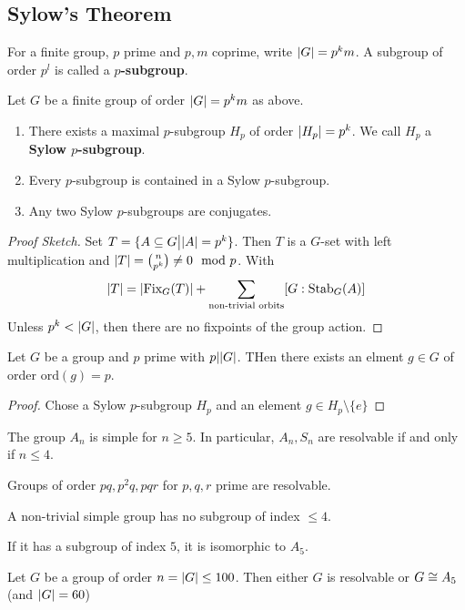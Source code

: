 \subsection{Sylow's Theorem}

\begin{dfn}[]
  For a finite group, $p$ prime and $p,m$ coprime, write
  $\vert G\vert = p^{k} m$.
  A subgroup of order $p^{l}$ is called a \textbf{$p$-subgroup}.
\end{dfn}

\begin{thm}
  Let $G$ be a finite group of order $\vert G\vert = p^{k}m$ as above. 
  \begin{enumerate}
    \item There exists a maximal $p$-subgroup $H_p$ of order $\vert H_p\vert = p^{k}$. We call $H_p$ a \textbf{Sylow $p$-subgroup}.
    \item Every $p$-subgroup is contained in a Sylow $p$-subgroup.
    \item Any two Sylow $p$-subgroups are conjugates.
  \end{enumerate}
\end{thm}
\begin{proof}[Proof Sketch]
Set $T = \{A \subseteq G \big\vert \vert A\vert = p^{k}\}$.
Then $T$ is a $G$-set with left multiplication and $\vert T\vert = \binom{n}{p^{k}} \neq 0 \mod p$.
With
\begin{align*}
  \vert T\vert = \vert\text{Fix}_G(T)\vert + \sum_{\text{non-trivial orbits}} [G: \text{Stab}_G(A)]
\end{align*}
Unless $p^{k} < \vert G\vert$, then there are no fixpoints of the group action. 
\end{proof}


\begin{cor}[]
  Let $G$ be a group and $p$ prime with $p | \vert G\vert$. THen there exists an elment $g \in G$ of order $\text{ord}(g) = p$.
\end{cor}
\begin{proof}
Chose a Sylow $p$-subgroup $H_p$ and an element $g \in H_p \setminus \{e\}$
\end{proof}

\begin{prop}[]
The group $A_n$ is simple for $n \geq 5$.
In particular, $A_n,S_n$ are resolvable if and only if $n \leq 4$.
\end{prop}
\begin{prop}[]
Groups of order $pq,p^{2}q,pqr$ for $p,q,r$ prime are resolvable.
\end{prop}

\begin{lem}[]
A non-trivial simple group has no subgroup of index $\leq 4$.

If it has a subgroup of index $5$, it is isomorphic to $A_5$.
\end{lem}


\begin{thm}
Let $G$ be a group of order $n = \vert G\vert \leq 100$.
Then either $G$ is resolvable or $G \cong A_5$ (and $\vert G\vert = 60$)
\end{thm}

